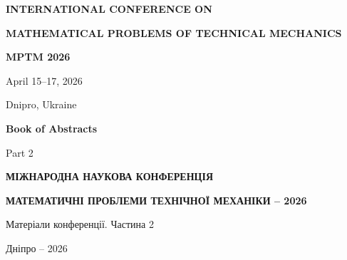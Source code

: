 \begin{titlepage}
\centering

{\Large\bfseries INTERNATIONAL CONFERENCE ON\par}
\vspace{0.35em}
{\LARGE\bfseries MATHEMATICAL PROBLEMS OF TECHNICAL MECHANICS\par}
\vspace{1.2em}
{\Huge\bfseries MPTM 2026\par}
\vspace{0.8em}
{\Large April 15--17, 2026\par}
{\Large Dnipro, Ukraine\par}

\vfill

{\LARGE\bfseries Book of Abstracts\par}
\vspace{0.5em}
{\Large Part 2\par}

\vfill

{\Large\bfseries МІЖНАРОДНА НАУКОВА КОНФЕРЕНЦІЯ\par}
\vspace{0.35em}
{\LARGE\bfseries МАТЕМАТИЧНІ ПРОБЛЕМИ ТЕХНІЧНОЇ МЕХАНІКИ -- 2026\par}
\vspace{1em}
{\Large Матеріали конференції. Частина 2\par}

\vfill

{\Large Дніпро -- 2026\par}
\end{titlepage}
